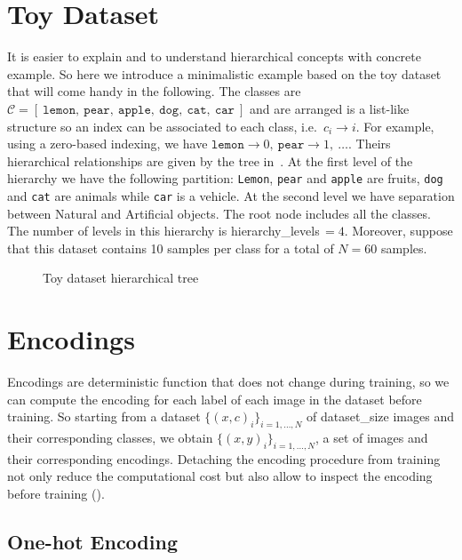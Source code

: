 \section{Toy Dataset}
\label{sec:toy-dataset}

It is easier to explain and to understand hierarchical concepts with concrete example. So here we introduce a minimalistic example based on the toy dataset that will come handy in the following. The classes are $\mathcal{C} = [\ \texttt{lemon},\ \texttt{pear},\ \texttt{apple},\ \texttt{dog},\ \texttt{cat},\ \texttt{car}\ ]$ and are arranged is a list-like structure so an index can be associated to each class, i.e.\ $c_i \to i$.
For example, using a zero-based indexing, we have $\texttt{lemon} \to 0,\ \texttt{pear} \to 1,\ \ldots$. Theirs hierarchical relationships are given by the tree in~. At the first level of the hierarchy we have the following partition: \texttt{Lemon}, \texttt{pear} and \texttt{apple} are fruits, \texttt{dog} and \texttt{cat} are animals while \texttt{car} is a vehicle. At the second level we have separation between Natural and Artificial objects. The root node includes all the classes. The number of levels in this hierarchy is \gls{hierarchy_levels}$\,=4$. Moreover, suppose that this dataset contains 10 samples per class for a total of $N = 60$ samples.
\begin{figure}[htbp]
  \caption{Toy dataset hierarchical tree}
  \label{fig:03/toy-dataset}
\end{figure}

\section{Encodings}
\label{sec:encodings}

Encodings are deterministic function that does not change during training, so we can compute the encoding for each label of each image in the dataset before training. So starting from a dataset $\{ \left(x, c\right)_i \}_{i = 1, \ldots, N}$ of \gls{dataset_size} images and their corresponding classes, we obtain $\{ \left(x, y\right)_i \}_{i = 1, \ldots, N}$, a set of images and their corresponding encodings.
Detaching the encoding procedure from training not only reduce the computational cost but also allow to inspect the encoding before training ().

\subsection{One-hot Encoding}
\label{subsec:one-hot-encoding}

